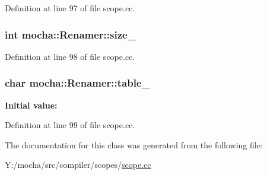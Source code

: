 Definition at line 97 of file scope.cc.

\hypertarget{classmocha_1_1_renamer_a9ce518fa1f650ad5b9b8414cf1561184}{
\subsubsection[{size\_\-}]{\setlength{\rightskip}{0pt plus 5cm}int {\bf mocha::Renamer::size\_\-}}}
\label{classmocha_1_1_renamer_a9ce518fa1f650ad5b9b8414cf1561184}


Definition at line 98 of file scope.cc.

\hypertarget{classmocha_1_1_renamer_a1de2b2e14de4fe8bbf4335ba5629eee6}{
\subsubsection[{table\_\-}]{\setlength{\rightskip}{0pt plus 5cm}char {\bf mocha::Renamer::table\_\-}}}
\label{classmocha_1_1_renamer_a1de2b2e14de4fe8bbf4335ba5629eee6}
{\bfseries Initial value:}


Definition at line 99 of file scope.cc.



The documentation for this class was generated from the following file:\begin{DoxyCompactItemize}
\item 
Y:/mocha/src/compiler/scopes/\hyperlink{scope_8cc}{scope.cc}\end{DoxyCompactItemize}
